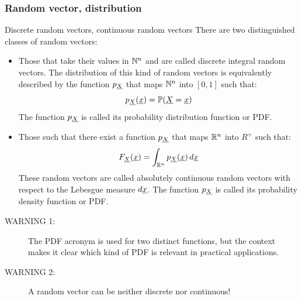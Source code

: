 \documentclass[8pt]{beamer}
\begin{document}
\begin{frame}
  \frametitle{Random vector, distribution}
  \begin{block}{Discrete random vectors, continuous random vectors}
    There are two distinguished classes of random vectors:
    \begin{itemize}
    \item Those that take their values in ${\mathbb N}^n$ and are called \alert{discrete integral} random vectors. The distribution of this kind of random vectors is equivalently described by the function $p_{{\underline{X}}}$ that maps ${\mathbb N}^n$ into $[0, 1]$ such that:
      \begin{equation}
        p_{{\underline{X}}}({\underline{x}})={\mathbb P}({\underline{X}}={\underline{x}})
      \end{equation}
      The function $p_{{\underline{X}}}$ is called its \alert{probability distribution function or PDF}.
    \item Those such that there exist a function $p_{{\underline{X}}}$ that maps ${\mathbb R}^n$ into $R^{+}$ such that:
      \begin{equation}
        F_{{\underline{X}}}({\underline{x}})=\int_{{\mathbb R}^n}p_{{\underline{X}}}({\underline{x}})\,d{\underline{x}}
      \end{equation}
      These random vectors are called \alert{absolutely continuous} random vectors with respect to the Lebesgue measure $d{\underline{x}}$. The function $p_{{\underline{X}}}$ is called its \alert{probability density function or PDF}.
    \end{itemize}
    \begin{description}
    \item[\alert{WARNING 1:}] The PDF acronym is used for two distinct functions, but the context makes it clear which kind of PDF is relevant in practical applications.
    \item[\alert{WARNING 2:}] A random vector can be neither discrete nor continuous!
    \end{description}
  \end{block}
\end{frame}
\end{document}
